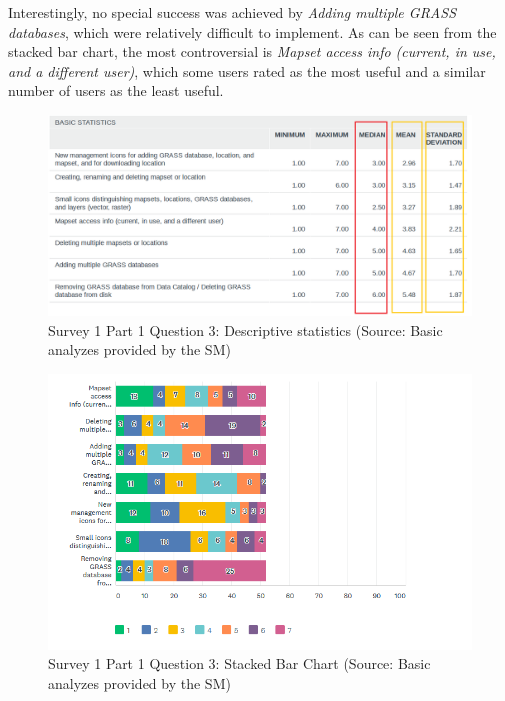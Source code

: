 \documentclass[a4paper,10pt,twoside]{article}
\begin{document}
Interestingly, no special success was achieved by \textit{Adding multiple GRASS databases}, which were relatively difficult to implement. As can be seen from the stacked bar chart, the most controversial is \textit{Mapset access info (current, in use, and a different user)}, which some users rated as the most useful and a similar number of users as the least useful.

\vspace{0.3cm}
\begin{figure}[hbt!] 
\begin{center}
\includegraphics[width=16cm]{../surveys/analyzed_data/survey1_part1_question3_descriptive_stats_sm.png} 
\caption[Survey 1 Part 1 Question 3: Descriptive statistics]{Survey 1 Part 1 Question 3: Descriptive statistics (Source: Basic analyzes provided by the SM)}
\label{fig:survey1_part1_question3_descriptive_stats_sm}
\end{center}
\end{figure}

\vspace{0.3cm}
\begin{figure}[hbt!] 
\begin{center}
\includegraphics[width=16cm]{../surveys/analyzed_data/survey1_part1_question3_histogram.png} 
\caption[Survey 1 Part 1 Question 3: Stacked Bar Chart ]{Survey 1 Part 1 Question 3: Stacked Bar Chart (Source: Basic analyzes provided by the SM)}
\label{fig:survey1_part1_question3_histogram}
\end{center}
\end{figure}
\end{document}
